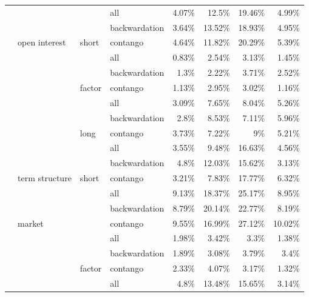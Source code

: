 \documentclass[]{elsarticle} %
\begin{document}
\begin{longtable}[t]{>{}llllrrrr}
\nopagebreak
 &  &  & all & 4.07\% & 12.5\% & 19.46\% & 4.99\%\\
\nopagebreak
 &  &  & backwardation & 3.64\% & 13.52\% & 18.93\% & 4.95\%\\
\nopagebreak
 & \multirow[t]{-9}{*}{\raggedright\arraybackslash open interest} & \multirow[t]{-3}{*}{\raggedright\arraybackslash short} & contango & 4.64\% & 11.82\% & 20.29\% & 5.39\%\\
\nopagebreak
 &  &  & all & 0.83\% & 2.54\% & 3.13\% & 1.45\%\\
\nopagebreak
 &  &  & backwardation & 1.3\% & 2.22\% & 3.71\% & 2.52\%\\
\nopagebreak
 &  & \multirow[t]{-3}{*}{\raggedright\arraybackslash factor} & contango & 1.13\% & 2.95\% & 3.02\% & 1.16\%\\
\nopagebreak
 &  &  & all & 3.09\% & 7.65\% & 8.04\% & 5.26\%\\
\nopagebreak
 &  &  & backwardation & 2.8\% & 8.53\% & 7.11\% & 5.96\%\\
\nopagebreak
 &  & \multirow[t]{-3}{*}{\raggedright\arraybackslash long} & contango & 3.73\% & 7.22\% & 9\% & 5.21\%\\
\nopagebreak
 &  &  & all & 3.55\% & 9.48\% & 16.63\% & 4.56\%\\
\nopagebreak
 &  &  & backwardation & 4.8\% & 12.03\% & 15.62\% & 3.13\%\\
\nopagebreak
\multirow[t]{-30}{*}{\raggedright\arraybackslash \textbf{open interest}} & \multirow[t]{-9}{*}{\raggedright\arraybackslash term structure} & \multirow[t]{-3}{*}{\raggedright\arraybackslash short} & contango & 3.21\% & 7.83\% & 17.77\% & 6.32\%\\
\cmidrule{1-8}\pagebreak[0]
 &  &  & all & 9.13\% & 18.37\% & 25.17\% & 8.95\%\\
\nopagebreak
 &  &  & backwardation & 8.79\% & 20.14\% & 22.77\% & 8.19\%\\
\nopagebreak
 & \multirow[t]{-3}{*}{\raggedright\arraybackslash market} &  & contango & 9.55\% & 16.99\% & 27.12\% & 10.02\%\\
\nopagebreak
 &  &  & all & 1.98\% & 3.42\% & 3.3\% & 1.38\%\\
\nopagebreak
 &  &  & backwardation & 1.89\% & 3.08\% & 3.79\% & 3.4\%\\
\nopagebreak
 &  & \multirow[t]{-6}{*}{\raggedright\arraybackslash factor} & contango & 2.33\% & 4.07\% & 3.17\% & 1.32\%\\
\nopagebreak
 &  &  & all & 4.8\% & 13.48\% & 15.65\% & 3.14\%\\

\end{longtable}
\end{document}
